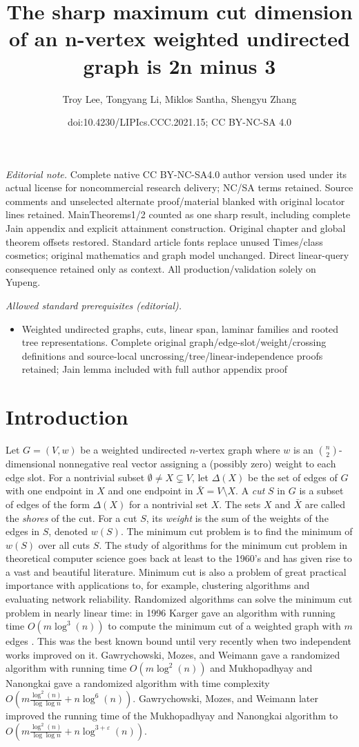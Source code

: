 \documentclass[10pt,a4paper]{article}
\title{The sharp maximum cut dimension of an n-vertex weighted undirected graph is 2n minus 3}
\author{Troy Lee, Tongyang Li, Miklos Santha, Shengyu Zhang}
\date{doi:10.4230/LIPIcs.CCC.2021.15; CC BY-NC-SA 4.0}
\newcommand{\1}{\mathbf{1}}
\theoremstyle{definition}
\begin{document}
\maketitle
\noindent\textit{Editorial note.} Complete native CC BY-NC-SA4.0 author version used under its actual license for noncommercial research delivery; NC/SA terms retained. Source comments and unselected alternate proof/material blanked with original locator lines retained. MainTheorems1/2 counted as one sharp result, including complete Jain appendix and explicit attainment construction. Original chapter and global theorem offsets restored. Standard article fonts replace unused Times/class cosmetics; original mathematics and graph model unchanged. Direct linear-query consequence retained only as context. All production/validation solely on Yupeng.\par\medskip
\noindent\textit{Allowed standard prerequisites (editorial).}\begin{itemize}
\item Weighted undirected graphs, cuts, linear span, laminar families and rooted tree representations. Complete original graph/edge-slot/weight/crossing definitions and source-local uncrossing/tree/linear-independence proofs retained; Jain lemma included with full author appendix proof
\end{itemize}\medskip
\section{Introduction}
Let $G = (V,w)$ be a weighted undirected $n$-vertex graph where $w$ is an $\binom{n}{2}$-dimensional nonnegative real vector assigning a (possibly zero) weight to each edge slot.  For a
nontrivial subset $\emptyset \ne X \subsetneq V$, let $\Delta(X)$ be the set of edges of $G$ with one endpoint in $X$ and one endpoint in $\bar{X} = V \setminus X$.  A \emph{cut} $S$ in $G$ is a subset of edges of the form $\Delta(X)$ for
a nontrivial set $X$.  The sets $X$ and $\bar{X}$ are called the \emph{shores} of the cut.  For a cut $S$, its \emph{weight} is the sum of the weights of the edges in $S$, denoted $w(S)$.
The minimum cut problem is to find the minimum of $w(S)$ over all cuts $S$.  The study of algorithms for the minimum cut
problem in theoretical computer science goes back at least to the 1960's and has given rise to a vast and beautiful literature.
Minimum cut is also a problem of great practical importance with applications
to, for example, clustering algorithms and evaluating network reliability. Randomized algorithms can solve the minimum cut problem in nearly linear time: in 1996 Karger gave an
algorithm with running time $O(m \log^3(n))$ to compute the minimum cut of a weighted graph with $m$ edges \cite{Karger00}.  This was the best known bound until very recently when two independent
works improved on it.  Gawrychowski, Mozes, and Weimann \cite{GMW20} gave a randomized algorithm with running time $O(m\log^2(n))$ \cite{GMW20} and Mukhopadhyay and Nanongkai \cite{MN20} gave a randomized algorithm with time complexity $O(m\frac{\log^2(n)}{\log\log n}+n\log^6(n))$.   Gawrychowski, Mozes, and Weimann \cite{GMW20b} later improved the running time of the Mukhopadhyay and Nanongkai algorithm to $O(m\frac{\log^2(n)}{\log\log n}+n\log^{3+\varepsilon}(n))$.
\end{document}
